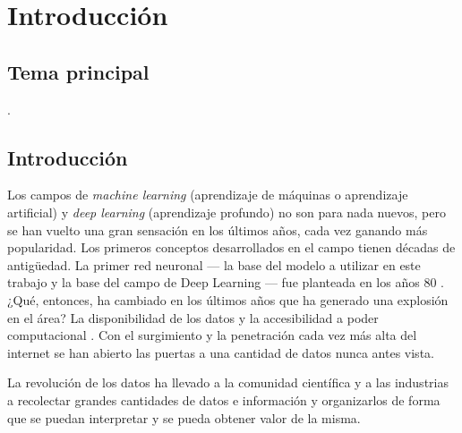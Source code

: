 
\chapter{Introducción} %

\label{Chapter1} %


\newcommand{\keyword}[1]{\textbf{#1}}
\newcommand{\tabhead}[1]{\textbf{#1}}
\newcommand{\code}[1]{\texttt{#1}}
\newcommand{\file}[1]{\texttt{\bfseries#1}}
\newcommand{\option}[1]{\texttt{\itshape#1}}


\section{Tema principal}

\ttitle.



\section{Introducción}

Los campos de \emph{\gls{machine learning}} (aprendizaje de máquinas o aprendizaje artificial) y \textit{\gls{deep learning}} (\gls{aprendizaje profundo}) \parencite{lecun2015deep} no son para nada nuevos, pero se han vuelto una gran sensación en los últimos años, cada vez ganando más popularidad. Los primeros conceptos desarrollados en el campo tienen décadas de antigüedad. La primer \gls{red neuronal} --- la base del modelo a utilizar en este trabajo y la base del campo de Deep Learning --- fue planteada en los años 80 \parencite{werbos1982applications}. ¿Qué, entonces, ha cambiado en los últimos años que ha generado una explosión en el área? La disponibilidad de los datos y la accesibilidad a poder computacional \parencite{jordan2015machine}. Con el surgimiento y la penetración cada vez más alta del internet se han abierto las puertas a una cantidad de datos nunca antes vista.

La revolución de los datos ha llevado a la comunidad científica y a las industrias a recolectar grandes cantidades de datos e información y organizarlos de forma que se puedan interpretar y se pueda obtener valor de la misma.

